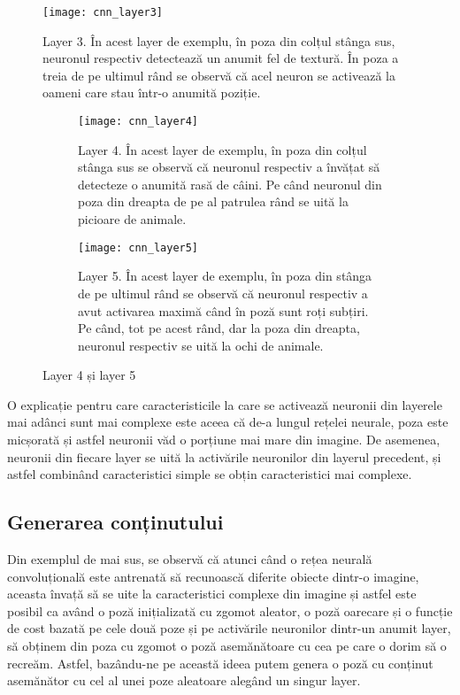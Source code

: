 \begin{figure}[h]
		\centering
        \texttt{[image: cnn\_layer3]}
        \caption{Layer 3. În acest layer de exemplu, în poza din colțul stânga sus, neuronul respectiv detectează un anumit fel de textură. În poza a treia de pe ultimul rând se observă că acel neuron se activează la oameni care stau într-o anumită poziție.}
        \label{fig:cnn_layer3}
\end{figure}
\begin{figure}[h]
	\centering
	\begin{subfigure}[b]{0.4\textwidth}
		\centering
        \texttt{[image: cnn\_layer4]}
        \caption{Layer 4. În acest layer de exemplu, în poza din colțul stânga sus se observă că neuronul respectiv a învățat să detecteze o anumită rasă de câini. Pe când neuronul din poza din dreapta de pe al patrulea rând se uită la picioare de animale.}
        \label{fig:cnn_layer4}
	\end{subfigure}
    \hfill
    \begin{subfigure}[b]{0.4\textwidth}
		\centering
        \texttt{[image: cnn\_layer5]}
        \caption{Layer 5. În acest layer de exemplu, în poza din stânga de pe ultimul rând se observă că neuronul respectiv a avut activarea maximă când în poză sunt roți subțiri. Pe când, tot pe acest rând, dar la poza din dreapta, neuronul respectiv se uită la ochi de animale.}
        \label{fig:cnn_layer5}
	\end{subfigure}
    \caption{Layer 4 și layer 5}
    \label{fig:cnn_layer4_5}
\end{figure}

O explicație pentru care caracteristicile la care se activează neuronii din layerele mai adânci sunt mai complexe este aceea că de-a lungul rețelei neurale, poza este micșorată și astfel neuronii văd o porțiune mai mare din imagine. De asemenea, neuronii din fiecare layer se uită la activările neuronilor din layerul precedent, și astfel combinând caracteristici simple se obțin caracteristici mai complexe.

\subsection{Generarea conținutului}
\label{ss:genc}
Din exemplul de mai sus, se observă că atunci când o rețea neurală convoluțională este antrenată să recunoască diferite obiecte dintr-o imagine, aceasta învață să se uite la caracteristici complexe din imagine și astfel este posibil ca având o poză inițializată cu zgomot aleator, o poză oarecare și o funcție de cost bazată pe cele două poze și pe activările neuronilor dintr-un anumit layer, să obținem din poza cu zgomot o poză asemănătoare cu cea pe care o dorim să o recreăm. \cite{mahendran2014} Astfel, bazându-ne pe această ideea putem genera o poză cu conținut asemănător cu cel al unei poze aleatoare alegând un singur layer.


